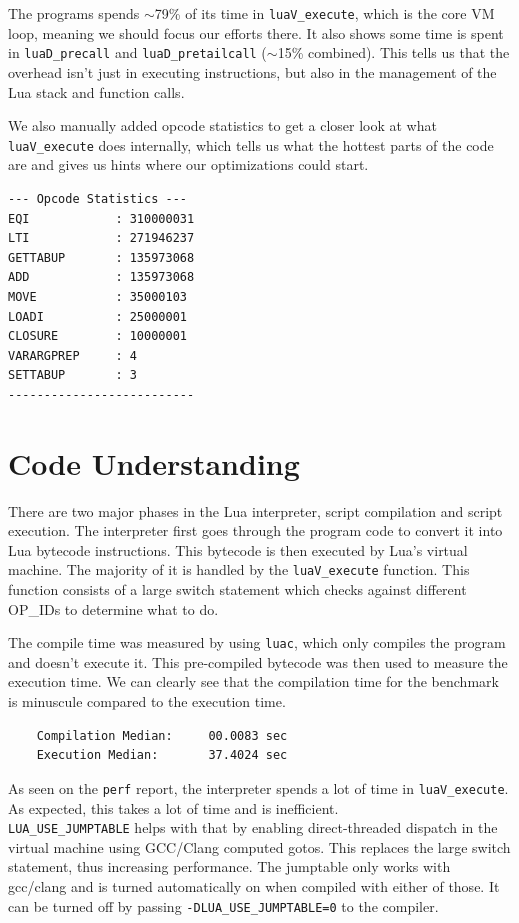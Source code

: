 \documentclass[a4paper]{article}
\begin{document}
The programs spends $\sim$79\% of its time in \texttt{luaV\_execute}, which is the core VM loop, meaning we should focus our efforts there. It also shows some time is spent in \texttt{luaD\_precall} and \texttt{luaD\_pretailcall} ($\sim$15\% combined). This tells us that the overhead isn't just in executing instructions, but also in the management of the Lua stack and function calls.

We also manually added opcode statistics to get a closer look at what \texttt{luaV\_execute} does internally, which tells us what the hottest parts of the code are and gives us hints where our optimizations could start.

\begin{verbatim}
--- Opcode Statistics ---
EQI            : 310000031
LTI            : 271946237
GETTABUP       : 135973068
ADD            : 135973068
MOVE           : 35000103
LOADI          : 25000001
CLOSURE        : 10000001
VARARGPREP     : 4
SETTABUP       : 3
--------------------------
\end{verbatim}

\section{Code Understanding}
There are two major phases in the Lua interpreter, script compilation and script execution. The interpreter first goes through the program code to convert it into Lua bytecode instructions. This bytecode is then executed by Lua's virtual machine. The majority of it is handled by the \texttt{luaV\_execute} function. This function consists of a large switch statement which checks against different OP\_IDs to determine what to do.

The compile time was measured by using \texttt{luac}, which only compiles the program and doesn't execute it. This pre-compiled bytecode was then used to measure the execution time. We can clearly see that the compilation time for the benchmark is minuscule compared to the execution time. 

\begin{verbatim}
    Compilation Median:     00.0083 sec
    Execution Median:       37.4024 sec
\end{verbatim}

As seen on the \texttt{perf} report, the interpreter spends a lot of time in \texttt{luaV\_execute}. As expected, this takes a lot of time and is inefficient.
\\
\texttt{LUA\_USE\_JUMPTABLE} helps with that by enabling direct-threaded dispatch in the virtual machine using GCC/Clang computed gotos. This replaces the large switch statement, thus increasing performance. The jumptable only works with gcc/clang and is turned automatically on when compiled with either of those. It can be turned off by passing \texttt{-DLUA\_USE\_JUMPTABLE=0} to the compiler.
\end{document}
